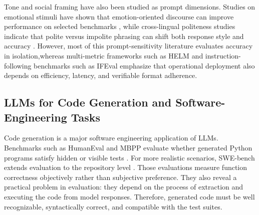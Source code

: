 \documentclass[a4paper,fleqn]{cas-sc}
\begin{document}
Tone and social framing have also been studied as prompt dimensions. Studies on emotional stimuli have shown that emotion-oriented discourse can improve performance on selected benchmarks \citep{li2023emotionprompt}, while cross-lingual politeness studies indicate that polite versus impolite phrasing can shift both response style and accuracy \citep{yin2024politeness}. However, most of this prompt-sensitivity literature evaluates accuracy in isolation,whereas multi-metric frameworks such as HELM \citep{liang2023helm} and instruction-following benchmarks such as IFEval \citep{zhou2023ifeval} emphasize that operational deployment also depends on efficiency, latency, and verifiable format adherence.

\subsection{LLMs for Code Generation and Software-Engineering
Tasks}\label{llms-for-code-generation-and-software-engineering-tasks}

Code generation is a major software engineering application of LLMs. Benchmarks such as HumanEval and MBPP evaluate whether generated Python programs satisfy hidden or visible tests \citep{chen2021codex, austin2021mbpp}. For more realistic scenarios, SWE-bench extends evaluation to the repository level \citep{jimenez2024swebench}. Those evaluations measure function correctness objectively rather than subjective preference. They also reveal a practical problem in evaluation: they depend on the process of extraction and executing the code from model responses. Therefore, generated code must be well recognizable, syntactically correct, and compatible with the test suites.
\end{document}
